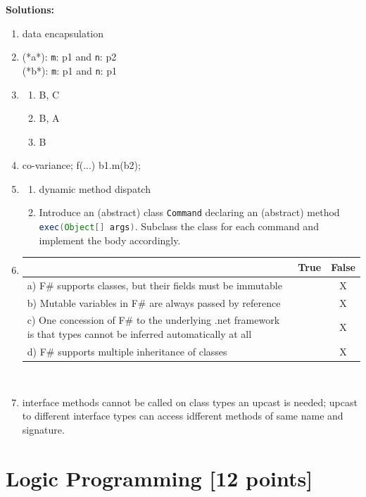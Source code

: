 \documentclass{article}
\newcommand{\solution}[1] {\textbf{Solutions:}\\ #1}
\begin{document}
\solution{
  \begin{enumerate}
  \item data encapsulation
  \item (*a*): \texttt{m}: p1 and \texttt{n}: p2\\
    (*b*): \texttt{m}: p1 and \texttt{n}: p1 
  \item \begin{enumerate}
    \item B, C
    \item B, A
    \item B
    \end{enumerate}
  \item co-variance; f(...) { b1.m(b2); }
  \item \begin{enumerate}
    \item dynamic method dispatch
    \item Introduce an (abstract) class \lstinline[language=Java,
      columns=flexible]{Command} declaring an (abstract) method
      \lstinline[language=Java, columns=flexible]{exec(Object[] args)}.
      Subclass the class for each command and implement the body
      accordingly. 
    \end{enumerate}
  \item 
    \begin{tabular}{|p{6cm}|c|c|}\hline
      & True & False \\ \hline
      a) F\# supports classes, but their fields must be immutable & & X \\\hline
      b) Mutable variables in F\# are always passed by reference & & X \\\hline
      c) One concession of F\#  to the underlying \textsf{.net}
      framework is that types cannot be inferred automatically at all &
      & X \\\hline
      d) F\# supports multiple inheritance of classes & & X\\\hline
    \end{tabular}\\
  \item interface methods cannot be called on class types an upcast is
    needed; upcast to different interface types can access idfferent
    methods of same name and signature.
  \end{enumerate}

}

\newpage


\section{Logic Programming [12 points]}
\end{document}
